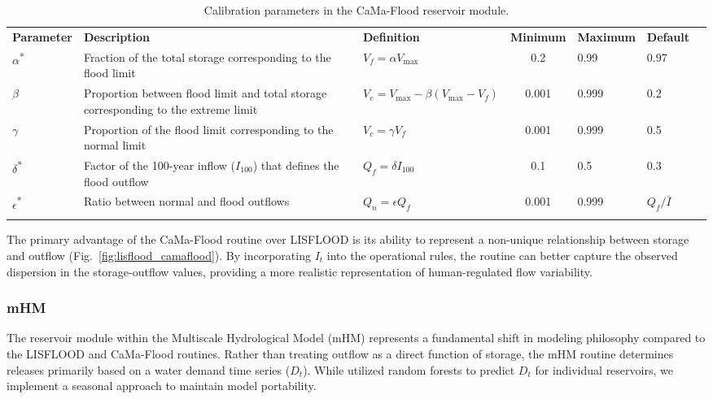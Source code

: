 \documentclass[hess, manuscript]{copernicus}
\begin{document}
\begin{table}[t]
    \centering
    \caption{Calibration parameters in the CaMa-Flood reservoir module.}
    \label{tab:parameters_camaflood}
    \begin{tabularx}{\textwidth}{lXlclll}
        \tophline
        \textbf{Parameter} & \textbf{Description} & \textbf{Definition} & \textbf{Minimum} & \textbf{Maximum} & \textbf{Default} \\
        \middlehline
        $\alpha$\textsuperscript{*} & Fraction of the total storage corresponding to the flood limit & $V_f = \alpha V_{\max}$ & 0.2 & 0.99 & 0.97 \\
        $\beta$ & Proportion between flood limit and total storage corresponding to the extreme limit & $V_e = V_{\max} - \beta (V_{\max} - V_f)$ & 0.001 & 0.999 & 0.2 \\
        $\gamma$ & Proportion of the flood limit corresponding to the normal limit & $V_c = \gamma V_f$ & 0.001 & 0.999 & 0.5 \\
        $\delta$\textsuperscript{*} & Factor of the 100-year inflow ($I_{100}$) that defines the flood outflow & $Q_f = \delta I_{100}$ & 0.1 & 0.5 & 0.3 \\
        $\epsilon$\textsuperscript{*} & Ratio between normal and flood outflows & $Q_n = \epsilon Q_f$ & 0.001 & 0.999 & $Q_f / \bar{I}$ \\
         \bottomhline
    \end{tabularx}
\end{table}

The primary advantage of the CaMa-Flood routine over LISFLOOD is its ability to represent a non-unique relationship between storage and outflow (Fig.~\ref{fig:lisflood_camaflood}). By incorporating $I_t$ into the operational rules, the routine can better capture the observed dispersion in the storage-outflow values, providing a more realistic representation of human-regulated flow variability.

\subsubsection{mHM}
\label{sec:mhm}

The reservoir module within the Multiscale Hydrological Model (mHM) \citep{Samaniego2010, Kumar2013, Thober2019} represents a fundamental shift in modeling philosophy compared to the LISFLOOD and CaMa-Flood routines. Rather than treating outflow as a direct function of storage, the mHM routine determines releases primarily based on a water demand time series ($D_t$). While \citet{Shrestha2024} utilized random forests to predict $D_t$ for individual reservoirs, we implement a seasonal approach to maintain model portability.
\end{document}
